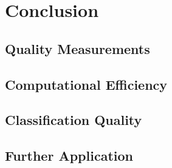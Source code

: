  

\chapter{Conclusion} 
\section{Quality Measurements}
\section{Computational Efficiency}
\section{Classification Quality}
\section{Further Application}
